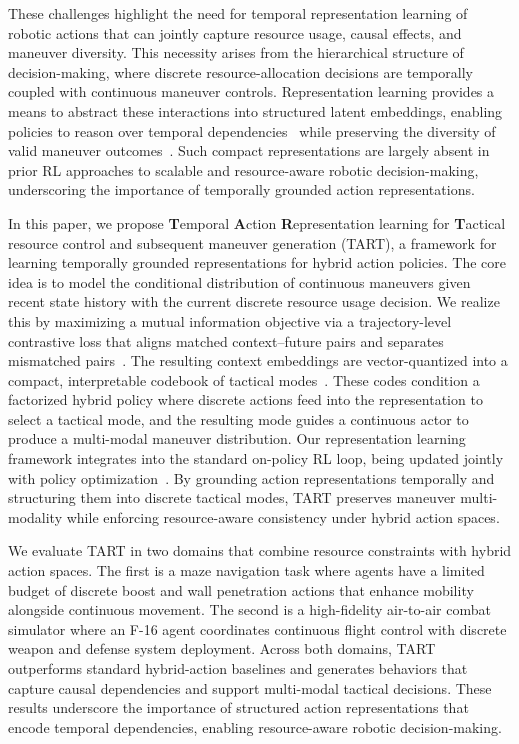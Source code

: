 These challenges highlight the need for temporal representation learning of robotic actions that can jointly capture resource usage, causal effects, and maneuver diversity.
This necessity arises from the hierarchical structure of decision-making, where discrete resource-allocation decisions are temporally coupled with continuous maneuver controls.
Representation learning provides a means to abstract these interactions into structured latent embeddings, enabling policies to reason over temporal dependencies~\cite{ze2023visual, biza2025robot, bu2025univla} while preserving the diversity of valid maneuver outcomes~\cite{mehta2022learning ,luo2023action, zhu2023imitation}.
Such compact representations are largely absent in prior RL approaches to scalable and resource-aware robotic decision-making, underscoring the importance of temporally grounded action representations.

In this paper, we propose \textbf{T}emporal \textbf{A}ction \textbf{R}epresentation learning for \textbf{T}actical resource control and subsequent maneuver generation (TART), a framework for learning temporally grounded representations for hybrid action policies.
The core idea is to model the conditional distribution of continuous maneuvers given recent state history with the current discrete resource usage decision.
We realize this by maximizing a mutual information objective via a trajectory-level contrastive loss that aligns matched context--future pairs and separates mismatched pairs~\cite{oord2018representation}.
The resulting context embeddings are vector-quantized into a compact, interpretable codebook of tactical modes~\cite{van2017neural}.
These codes condition a factorized hybrid policy where discrete actions feed into the representation to select a tactical mode, and the resulting mode guides a continuous actor to produce a multi-modal maneuver distribution.
Our representation learning framework integrates into the standard on-policy RL loop, being updated jointly with policy optimization~\cite{schulman2017proximal}.
By grounding action representations temporally and structuring them into discrete tactical modes, TART preserves maneuver multi-modality while enforcing resource-aware consistency under hybrid action spaces.

We evaluate TART in two domains that combine resource constraints with hybrid action spaces.
The first is a maze navigation task where agents have a limited budget of discrete boost and wall penetration actions that enhance mobility alongside continuous movement.
The second is a high-fidelity air-to-air combat simulator where an F-16 agent coordinates continuous flight control with discrete weapon and defense system deployment.
Across both domains, TART outperforms standard hybrid-action baselines and generates behaviors that capture causal dependencies and support multi-modal tactical decisions.
These results underscore the importance of structured action representations that encode temporal dependencies, enabling resource-aware robotic decision-making.

